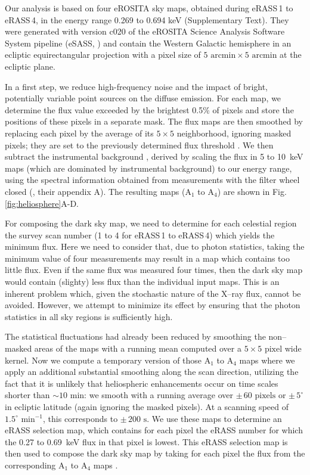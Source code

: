 \documentclass[12pt]{article}
\renewcommand{\deg}{^{\circ}}
\newcommand{\erass}{eRASS\,}
\begin{document}
Our analysis is based on four eROSITA sky maps, obtained during \erass1 to \erass4, in the energy range 0.269 to 0.694 keV (Supplementary Text). They were generated with version c020 of the eROSITA Science Analysis Software System pipeline (eSASS, \cite{bru22a}) and contain the Western Galactic hemisphere in an ecliptic equirectangular projection with a pixel size of $5\mbox{ arcmin}\times5\mbox{ arcmin}$ at the ecliptic plane.

In a first step, we reduce high-frequency noise and the impact of bright, potentially variable point sources on the diffuse emission. For each map, we determine the flux value exceeded by the brightest 0.5\% of pixels and store the positions of these pixels in a separate mask. The flux maps are then smoothed by replacing each pixel by the average of its $5\times5$ neighborhood, ignoring masked pixels; they are set to the previously determined flux threshold \cite{code:prep1}. We then subtract the instrumental background \cite{code:prep2}, derived by scaling the flux in 5 to 10~keV maps (which are dominated by instrumental background) to our energy range, using the spectral information obtained from measurements with the filter wheel closed (\cite{yeu23a}, their appendix A). The resulting maps (A$_1$ to A$_4$) are shown in Fig.\,\ref{fig:heliosphere}A-D.

For composing the dark sky map, we need to determine for each celestial region the survey scan number (1 to 4 for \erass1 to \erass4) which yields the minimum flux. Here we need to consider that, due to photon statistics, taking the minimum value of four measurements may result in a map which contains too little flux. Even if the same flux was measured four times, then the dark sky map would contain (slighty) less flux than the individual input maps. This is an inherent problem which, given the stochastic nature of the X--ray flux, cannot be avoided. However, we attempt to minimize its effect by ensuring that the photon statistics in all sky regions is sufficiently high.

The statistical fluctuations had already been reduced by smoothing the non--masked areas of the maps with a running mean computed over a $5\times5\mbox{ pixel}$ wide kernel. Now we compute a temporary version of those A$_1$ to A$_4$ maps where we apply an additional substantial smoothing along the scan direction, utilizing the fact that it is unlikely that heliospheric enhancements occur on time scales shorter than $\sim10\mbox{ min}$: we smooth with a running average over $\pm\,60\mbox{ pixels}$ or $\pm\,5\deg$ in ecliptic latitude (again ignoring the masked pixels). At a scanning speed of $1.5\deg\mbox{ min}^{-1}$, this corresponds to $\pm\,200\mbox{ s}$. We use these maps to determine an eRASS selection map, which contains for each pixel the eRASS number for which the 0.27 to 0.69~keV flux in that pixel is lowest. This eRASS selection map is then used to compose the dark sky map by taking for each pixel the flux from the corresponding A$_1$ to A$_4$ maps \cite{code:prep3}.
\end{document}
